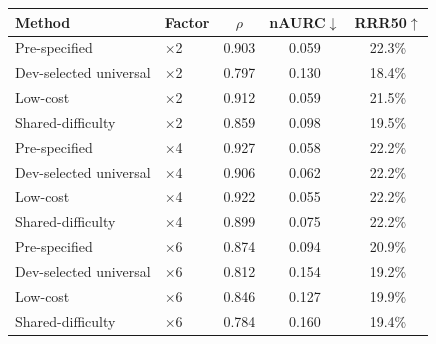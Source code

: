 \begin{tabular}{llccc}
\toprule
Method & Factor & $\rho$ & nAURC$\downarrow$ & RRR50$\uparrow$ \\
\midrule
Pre-specified & $\times$2 & 0.903 & 0.059 & 22.3\% \\
\addlinespace[1.5pt]
Dev-selected universal & $\times$2 & 0.797 & 0.130 & 18.4\% \\
\addlinespace[1.5pt]
Low-cost & $\times$2 & 0.912 & 0.059 & 21.5\% \\
\addlinespace[1.5pt]
Shared-difficulty & $\times$2 & 0.859 & 0.098 & 19.5\% \\
\addlinespace[1.5pt]
Pre-specified & $\times$4 & 0.927 & 0.058 & 22.2\% \\
\addlinespace[1.5pt]
Dev-selected universal & $\times$4 & 0.906 & 0.062 & 22.2\% \\
\addlinespace[1.5pt]
Low-cost & $\times$4 & 0.922 & 0.055 & 22.2\% \\
\addlinespace[1.5pt]
Shared-difficulty & $\times$4 & 0.899 & 0.075 & 22.2\% \\
\addlinespace[1.5pt]
Pre-specified & $\times$6 & 0.874 & 0.094 & 20.9\% \\
\addlinespace[1.5pt]
Dev-selected universal & $\times$6 & 0.812 & 0.154 & 19.2\% \\
\addlinespace[1.5pt]
Low-cost & $\times$6 & 0.846 & 0.127 & 19.9\% \\
\addlinespace[1.5pt]
Shared-difficulty & $\times$6 & 0.784 & 0.160 & 19.4\% \\
\bottomrule
\end{tabular}
